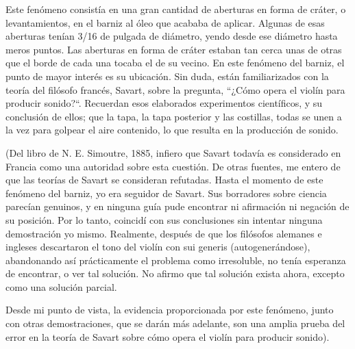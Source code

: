 \documentclass[12pt]{book}
\begin{document}
Este fenómeno consistía en una gran cantidad de aberturas en forma de cráter, o levantamientos, en el barniz al óleo que acababa de aplicar. Algunas de esas aberturas tenían 3/16 de pulgada de diámetro, yendo desde ese diámetro hasta meros puntos. Las aberturas en forma de cráter estaban tan cerca unas de otras que el borde de cada una tocaba el de su vecino. En este fenómeno del barniz, el punto de mayor interés es su ubicación. Sin duda, están familiarizados con la teoría del filósofo francés, Savart, sobre la pregunta, ``¿Cómo opera el violín para producir sonido?``. Recuerdan esos elaborados experimentos científicos, y su conclusión de ellos; que la tapa, la tapa posterior y las costillas, todas se unen a la vez para golpear el aire contenido, lo que resulta en la producción de sonido.

(Del libro de N. E. Simoutre, 1885, infiero que Savart todavía es considerado en Francia como una autoridad sobre esta cuestión. De otras fuentes, me entero de que las teorías de Savart se consideran refutadas. Hasta el momento de este fenómeno del barniz, yo era seguidor de Savart. Sus borradores sobre ciencia parecían genuinos, y en ninguna guía pude encontrar ni afirmación ni negación de su posición. Por lo tanto, coincidí con sus conclusiones sin intentar ninguna demostración yo mismo. Realmente, después de que los filósofos alemanes e ingleses descartaron el tono del violín con sui generis (autogenerándose), abandonando así prácticamente el problema como irresoluble, no tenía esperanza de encontrar, o ver tal solución. No afirmo que tal solución exista ahora, excepto como una solución parcial.

Desde mi punto de vista, la evidencia proporcionada por este fenómeno, junto con otras demostraciones, que se darán más adelante, son una amplia prueba del error en la teoría de Savart sobre cómo opera el violín para producir sonido).
\end{document}
